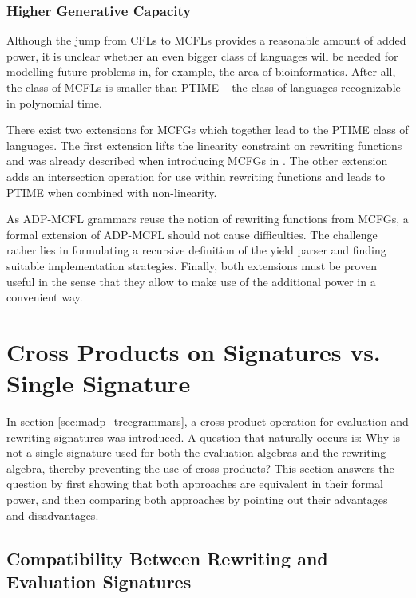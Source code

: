 \documentclass[
    a4paper,
    12pt,
    twoside,
    BCOR=12mm,
    parskip=half,
    chapterprefix,
    numbers=noenddot,
    bibliography=totoc
]{scrbook}
\begin{document}
\subsection*{Higher Generative Capacity}

Although the jump from \glspl{CFL} to \glspl{MCFL} provides a reasonable amount of added power, it is unclear whether an even bigger class of languages will be needed for modelling future problems in, for example, the area of bioinformatics. After all, the class of \glspl{MCFL} is smaller than PTIME -- the class of languages recognizable in polynomial time.

There exist two extensions for \glspl{MCFG} which together lead to the PTIME class of languages. The first extension lifts the linearity constraint on rewriting functions and was already described when introducing \glspl{MCFG} in \citet{seki_multiple_1991}. The other extension \citep{ljunglof_polynomial_2005} adds an intersection operation for use within rewriting functions and leads to PTIME when combined with non-linearity.

As \gls{ADP-MCFL} grammars reuse the notion of rewriting functions from \glspl{MCFG}, a formal extension of \gls{ADP-MCFL} should not cause difficulties. The challenge rather lies in formulating a recursive definition of the yield parser and finding suitable implementation strategies. Finally, both extensions must be proven useful in the sense that they allow to make use of the additional power in a convenient way.

\appendix

\cleardoublepage
{}
{}

\chapter{Cross Products on Signatures vs. Single Signature}
\label{sec:sig_products}

In section \ref{sec:madp_treegrammars}, a cross product operation for evaluation and rewriting signatures was introduced. A question that naturally occurs is: Why is not a single signature used for both the evaluation algebras and the rewriting algebra, thereby preventing the use of cross products? This section answers the question by first showing that both approaches are equivalent in their formal power, and then comparing both approaches by pointing out their advantages and disadvantages.

\section{Compatibility Between Rewriting and Evaluation Signatures}
\end{document}
